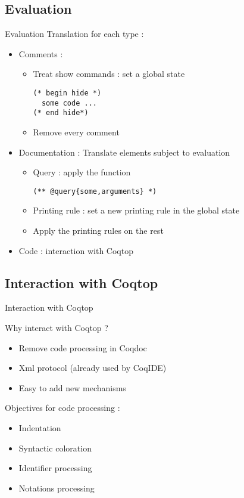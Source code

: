 \documentclass[compress]{beamer}
\newenvironment{tframe}[1]{
  \subsection{#1}
  \begin{frame}{#1}
  }{
  \end{frame}
  }
\begin{document}
    \subsection{Evaluation}
    \begin{frame}[containsverbatim]{Evaluation}
    Translation for each type :
    \begin{itemize}
      \item Comments : \\
         \begin{itemize}
           \item Treat show commands : set a global state
             \begin{lstlisting}
(* begin hide *)
  some code ...
(* end hide*)
\end{lstlisting}
           \item Remove every comment
        \end{itemize}
      \item Documentation : Translate elements subject to evaluation \\
        \begin{itemize}
          \item Query : apply the function
\begin{lstlisting}
(** @query{some,arguments} *)
\end{lstlisting}

          \item Printing rule : set a new printing rule in the global state
          \item Apply the printing rules on the rest
        \end{itemize}
      \item Code : interaction with Coqtop
    \end{itemize}
  \end{frame}


  \begin{tframe}{Interaction with Coqtop}
    Why interact with Coqtop ?
    \begin{itemize}
      \item Remove code processing in Coqdoc
      \item Xml protocol (already used by CoqIDE)
      \item Easy to add new mechanisms
    \end{itemize}
    \vfill
    Objectives for code processing :
    \begin{itemize}
      \item Indentation
      \item Syntactic coloration
      \item Identifier processing
      \item Notations processing %
    \end{itemize}
  \end{tframe}
\end{document}
